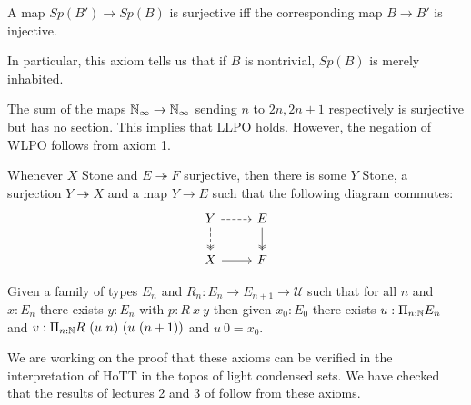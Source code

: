 \begin{axiom}
  A map $Sp(B')\to Sp(B)$ is surjective iff the corresponding map $B \to B'$ is injective.
\end{axiom} 
In particular, this axiom tells us that if $B$ is nontrivial, 
$Sp(B)$ is merely inhabited.


The sum of the maps
$\mathbb{N}_{\infty} \to \mathbb{N}_{\infty}$
sending $n$ to $2n,2n+1$ respectively
is surjective but has no section. 
This implies that LLPO holds. 
However, the negation of WLPO follows from axiom 1.  


\begin{axiom}
  Whenever $X$ Stone and $E\twoheadrightarrow F$ surjective, then there is some $Y$ Stone,
    a surjection $Y \twoheadrightarrow X$ and a map $Y\to E$ such that the following diagram commutes:
    \begin{equation*}\begin{tikzcd}
      Y \arrow [d, two heads,dashed] \arrow [r,dashed] & E \arrow[d,""',two heads]\\
      X \arrow[r] & F
    \end{tikzcd}\end{equation*}  
\end{axiom} 

\begin{axiom}
  Given a family of types $E_n$ and $R_n:E_n\rightarrow E_{n+1}\rightarrow {\mathcal U}$ such that
  for all $n$ and $x:E_n$ there exists $y:E_n$ with $p:R~x~y$ then given $x_0:E_0$ there exists
  $u:\Pi_{n:\mathbb{N}}E_n$ and $v:\Pi_{n:\mathbb{N}}R~(u~n)~(u~(n+1))$ and $u~0 = x_0$.
\end{axiom}

We are working on the proof that these axioms can be verified in the interpretation of HoTT in the topos of light condensed sets. We have checked that the results of lectures 2 and 3 of \cite{Scholze} follow from these axioms. 
